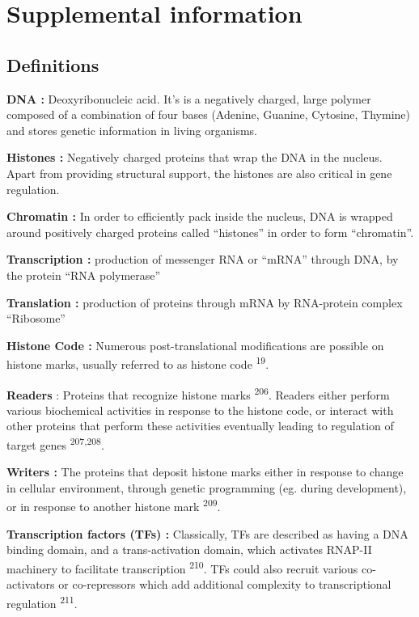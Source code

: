 \documentclass[11pt,twoside]{MPIthesis}
\theoremstyle{definition}
\theoremstyle{definition}
\theoremstyle{definition}
\theoremstyle{remark}
\begin{document}


\chapter{Supplemental information}\label{supplemental-information}

\section{Definitions}\label{definitions}

\textbf{DNA :} Deoxyribonucleic acid. It's is a negatively charged,
large polymer composed of a combination of four bases (Adenine, Guanine,
Cytosine, Thymine) and stores genetic information in living organisms.

\textbf{Histones :} Negatively charged proteins that wrap the DNA in the
nucleus. Apart from providing structural support, the histones are also
critical in gene regulation.

\textbf{Chromatin :} In order to efficiently pack inside the nucleus,
DNA is wrapped around positively charged proteins called ``histones'' in
order to form ``chromatin''.

\textbf{Transcription :} production of messenger RNA or ``mRNA'' through
DNA, by the protein ``RNA polymerase''

\textbf{Translation :} production of proteins through mRNA by
RNA-protein complex ``Ribosome''

\textbf{Histone Code :} Numerous post-translational modifications are
possible on histone marks, usually referred to as histone code
\textsuperscript{19}.

\textbf{Readers} : Proteins that recognize histone marks
\textsuperscript{206}. Readers either perform various biochemical
activities in response to the histone code, or interact with other
proteins that perform these activities eventually leading to regulation
of target genes \textsuperscript{207,208}.

\textbf{Writers :} The proteins that deposit histone marks either in
response to change in cellular environment, through genetic programming
(eg. during development), or in response to another histone mark
\textsuperscript{209}.

\textbf{Transcription factors (TFs) :} Classically, TFs are described as
having a DNA binding domain, and a trans-activation domain, which
activates RNAP-II machinery to facilitate transcription
\textsuperscript{210}. TFs could also recruit various co-activators or
co-repressors which add additional complexity to transcriptional
regulation \textsuperscript{211}.
\end{document}
